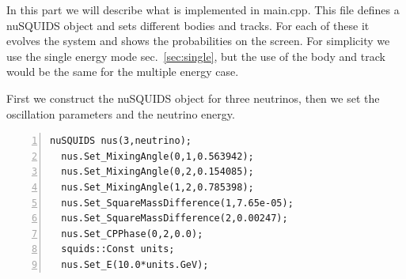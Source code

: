\documentclass[3p,12pt]{elsarticle}
\newcommand{\ttf}{\ttfamily}
\begin{document}
In this part we will describe what is implemented in {\ttf
  main.cpp}.
This file defines a nuSQUIDS object and sets different bodies and
tracks. For each of these it evolves the system and shows the
probabilities on the screen.
For simplicity we use the single energy mode sec.~\ref{sec:single}, but the use of the body
and track would be the same for the multiple energy case.

First we construct the nuSQUIDS object for three neutrinos, then we set the
oscillation parameters and the neutrino energy.

\begin{lstlisting}[frame=leftline, numbers =
  left,breaklines=true,label = ex:sin1]
  nuSQUIDS nus(3,neutrino);
  nus.Set_MixingAngle(0,1,0.563942);
  nus.Set_MixingAngle(0,2,0.154085);
  nus.Set_MixingAngle(1,2,0.785398);
  nus.Set_SquareMassDifference(1,7.65e-05);
  nus.Set_SquareMassDifference(2,0.00247);
  nus.Set_CPPhase(0,2,0.0);
  squids::Const units;
  nus.Set_E(10.0*units.GeV);
\end{lstlisting}
\end{document}
